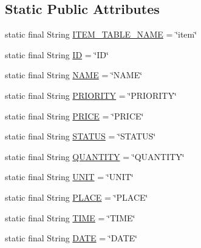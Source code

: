 \subsection*{Static Public Attributes}
\begin{DoxyCompactItemize}
\item 
static final String \hyperlink{classvip2012_1_1g07_1_1shoppinglist_1_1ItemHelper_a1c9b73729f92221e05c6e62cb361d7ab}{I\-T\-E\-M\-\_\-\-T\-A\-B\-L\-E\-\_\-\-N\-A\-M\-E} = \char`\"{}item\char`\"{}
\item 
static final String \hyperlink{classvip2012_1_1g07_1_1shoppinglist_1_1ItemHelper_a6bb17adfa7a6b9a117895a66f0f15edf}{I\-D} = \char`\"{}I\-D\char`\"{}
\item 
static final String \hyperlink{classvip2012_1_1g07_1_1shoppinglist_1_1ItemHelper_a773e78a4e566c4691c217c7fbacab750}{N\-A\-M\-E} = \char`\"{}N\-A\-M\-E\char`\"{}
\item 
static final String \hyperlink{classvip2012_1_1g07_1_1shoppinglist_1_1ItemHelper_a63cb23ee391ca2beb5a28779db85ee58}{P\-R\-I\-O\-R\-I\-T\-Y} = \char`\"{}P\-R\-I\-O\-R\-I\-T\-Y\char`\"{}
\item 
static final String \hyperlink{classvip2012_1_1g07_1_1shoppinglist_1_1ItemHelper_a84dbb86d92039880881973d05fde2ffa}{P\-R\-I\-C\-E} = \char`\"{}P\-R\-I\-C\-E\char`\"{}
\item 
static final String \hyperlink{classvip2012_1_1g07_1_1shoppinglist_1_1ItemHelper_a3a3acf6a228cace9a2d4161875b11958}{S\-T\-A\-T\-U\-S} = \char`\"{}S\-T\-A\-T\-U\-S\char`\"{}
\item 
static final String \hyperlink{classvip2012_1_1g07_1_1shoppinglist_1_1ItemHelper_a3768fd75026bdd908fa59303594e6168}{Q\-U\-A\-N\-T\-I\-T\-Y} = \char`\"{}Q\-U\-A\-N\-T\-I\-T\-Y\char`\"{}
\item 
static final String \hyperlink{classvip2012_1_1g07_1_1shoppinglist_1_1ItemHelper_a4b2f6f4439ec7a2ecc1a7bc24805a2cb}{U\-N\-I\-T} = \char`\"{}U\-N\-I\-T\char`\"{}
\item 
static final String \hyperlink{classvip2012_1_1g07_1_1shoppinglist_1_1ItemHelper_a587d4f82405480bd39b514936202da0d}{P\-L\-A\-C\-E} = \char`\"{}P\-L\-A\-C\-E\char`\"{}
\item 
static final String \hyperlink{classvip2012_1_1g07_1_1shoppinglist_1_1ItemHelper_af4ed8a9409f4623fb7755b37431ad5c0}{T\-I\-M\-E} = \char`\"{}T\-I\-M\-E\char`\"{}
\item 
static final String \hyperlink{classvip2012_1_1g07_1_1shoppinglist_1_1ItemHelper_a544cee85918c2a73299abc45f5de4ea9}{D\-A\-T\-E} = \char`\"{}D\-A\-T\-E\char`\"{}
\end{DoxyCompactItemize}


